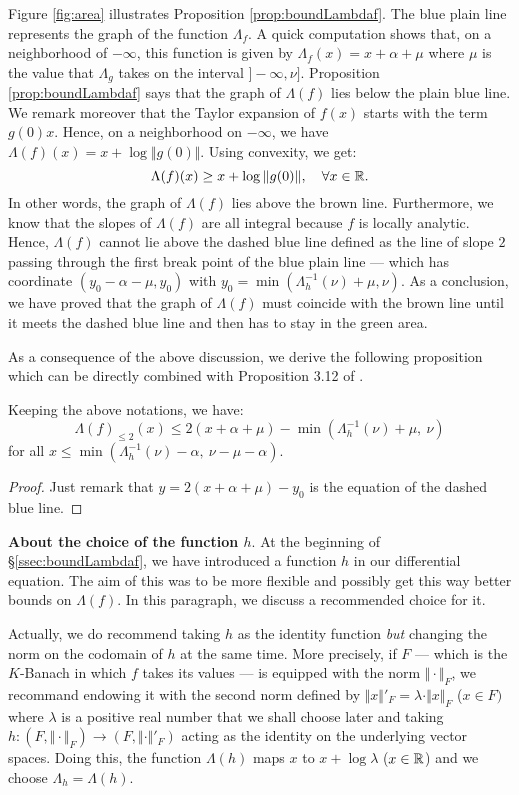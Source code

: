 \documentclass{sig-alternate}
\begin{document}
Figure \ref{fig:area} illustrates Proposition \ref{prop:boundLambdaf}. 
The blue plain line represents the graph of the function $\Lambda_f$. A 
quick computation shows that, on a neighborhood of ${-}\infty$, this 
function is given by $\Lambda_f(x) = x + \alpha + \mu$
where $\mu$ is the value that $\Lambda_g$ takes on the interval 
$]{-}\infty, \nu]$. Proposition \ref{prop:boundLambdaf} says that the
graph of $\Lambda(f)$ lies below the plain blue line. We remark
moreover that the Taylor expansion of $f(x)$ starts with the term
$g(0) x$. Hence, on a neighborhood on ${-}\infty$, we have 
$\Lambda(f)(x) = x + \log \Vert g(0) \Vert$. Using convexity, we 
get:
$$\Lambda(f)(x) \geq x + \log \Vert g(0) \Vert, 
  \quad \forall x \in \mathbb R.$$
In other words, the graph of $\Lambda(f)$ lies above the brown line.
Furthermore, we know that the slopes of $\Lambda(f)$ are all integral
because $f$ is locally analytic. Hence, $\Lambda(f)$ cannot lie above
the dashed blue line defined as the line of slope $2$ passing through
the first break point of the blue plain line --- which has coordinate 
$(y_0 - \alpha - \mu, y_0)$ with $y_0 = \min(\Lambda_h^{-1}(\nu) + \mu, 
\nu)$. As a conclusion, we have proved that the graph of $\Lambda(f)$ 
must coincide with the brown line until it meets the dashed blue line 
and then has to stay in the green area.

As a consequence of the above discussion, we derive the following 
proposition which can be directly combined with Proposition 3.12 of 
\cite{caruso-roe-vaccon:14a}.

\begin{prop}
\label{prop:boundLambdaf2}
Keeping the above notations, we have:
$$\Lambda(f)_{\leq 2} (x) \leq 2(x + \alpha + \mu) -
\min(\Lambda_h^{-1}(\nu) + \mu, \: \nu)$$
for all $x \leq \min(\Lambda_h^{-1}(\nu) - \alpha, \: \nu - \mu - \alpha)$.
\end{prop}

\begin{proof}
Just remark that $y = 2(x + \alpha + \mu) - y_0$ is the equation of 
the dashed blue line.
\end{proof}

\noindent
{\bf About the choice of the function $h$}.
At the beginning of \S \ref{ssec:boundLambdaf}, we have introduced a 
function $h$ in our differential equation. The aim of this was to be 
more flexible and possibly get this way better bounds on $\Lambda(f)$. 
In this paragraph, we discuss a recommended choice for it.

Actually, we do recommend taking $h$ as the identity function 
\emph{but} changing the norm on the codomain of $h$ at the same time.
More precisely, if $F$ --- which is the $K$-Banach in which $f$ takes
its values --- is equipped with the norm $\Vert \cdot \Vert_F$, we 
recommand endowing it with the second norm defined by
$\Vert x \Vert'_F = \lambda \cdot \Vert x \Vert_F$ ($x \in F)$
where $\lambda$ is a positive real number that we shall choose later 
and taking $h : (F, \Vert \cdot \Vert_F) \to (F, \Vert \cdot \Vert'_F)$ 
acting as the identity on the underlying vector spaces. Doing this, the 
function $\Lambda(h)$ maps $x$ to $x + \log \lambda$ ($x \in \mathbb R$) and we 
choose $\Lambda_h = \Lambda(h)$.
\end{document}

